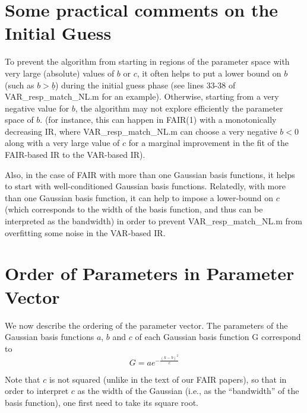 \documentclass[a4paper,12pt]{article}
\begin{document}
\section{Some practical comments on the Initial Guess}

To prevent the algorithm from starting in regions of the parameter space with very large (absolute) values of $b$ or $c$, it often helps to put a lower bound on $b$ (such as $b>\underline{b}$) during the initial guess phase (see lines 33-38 of VAR\_resp\_match\_NL.m for an example). Otherwise, starting from a very negative value for $b$, the algorithm may not explore efficiently the parameter space of $b$. (for instance, this can happen in FAIR(1) with a monotonically decreasing IR, where VAR\_resp\_match\_NL.m can choose a very negative $b<0$ along with a very large value of $c$ for a marginal improvement in the fit of the  FAIR-based IR to the VAR-based IR). 

Also, in the case of FAIR with more than one Gaussian basis functions, it helps to start with well-conditioned Gaussian basis functions. Relatedly, with more than one Gaussian basis function, it can help to impose a lower-bound on $c$ (which corresponds to the width of the basis function, and thus can be interpreted as the bandwidth) in order to prevent VAR\_resp\_match\_NL.m from overfitting some noise in the VAR-based IR. 


\section{Order of Parameters in Parameter Vector}

We now describe the ordering of the parameter vector. The parameters of the Gaussian basis functions $a$, $b$ and $c$ of each Gaussian basis function G correspond to \[
G=ae^{-\frac{(k-b)^{2}}{c}}
\]%

Note that $c$ is not squared (unlike in the text of our FAIR papers), so that in order to interpret $c$ as the width of the Gaussian (i.e., as the ``bandwidth'' of the basis function), one first need to take its square root.
\end{document}
